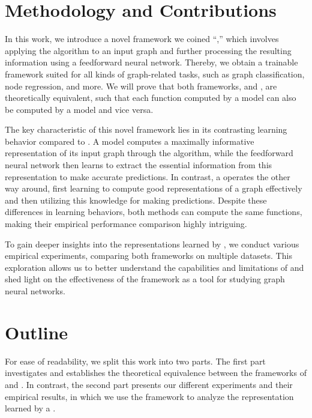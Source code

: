 
\section{Methodology and Contributions}
In this work, we introduce a novel framework we coined ``\wlnn,'' which involves applying the \wl algorithm to an input graph and further processing the resulting information using a feedforward neural network. Thereby, we obtain a trainable framework suited for all kinds of graph-related tasks, such as graph classification, node regression, and more. We will prove that both frameworks, \wlnn and \gnn, are theoretically equivalent, such that each function computed by a \wlnn model can also be computed by a \gnn model and vice versa.

The key characteristic of this novel framework lies in its contrasting learning behavior compared to \gnns. A \wlnn model computes a maximally informative representation of its input graph through the \wl algorithm, while the feedforward neural network then learns to extract the essential information from this representation to make accurate predictions. In contrast, a \gnn operates the other way around, first learning to compute good representations of a graph effectively and then utilizing this knowledge for making predictions. Despite these differences in learning behaviors, both methods can compute the same functions, making their empirical performance comparison highly intriguing.

To gain deeper insights into the representations learned by \gnns, we conduct various empirical experiments, comparing both frameworks on multiple datasets. This exploration allows us to better understand the capabilities and limitations of \gnns and shed light on the effectiveness of the \wlnn framework as a tool for studying graph neural networks.


\section{Outline}
For ease of readability, we split this work into two parts. The first part investigates and establishes the theoretical equivalence between the frameworks of \wlnn and \gnns. In contrast, the second part presents our different experiments and their empirical results, in which we use the \wlnn framework to analyze the representation learned by a \gnn.


